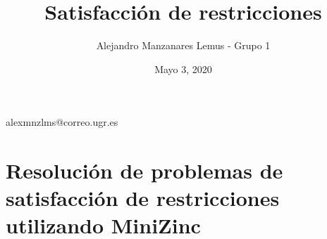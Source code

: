 \documentclass[10pt]{report}
\author{Alejandro Manzanares Lemus - Grupo 1}
\title{Satisfacción de restricciones}
\date{Mayo 3, 2020}
\begin{document}
            {}
            {alexmnzlms@correo.ugr.es}

\tableofcontents

\chapter{Resolución de problemas de satisfacción de restricciones utilizando MiniZinc}
\end{document}
